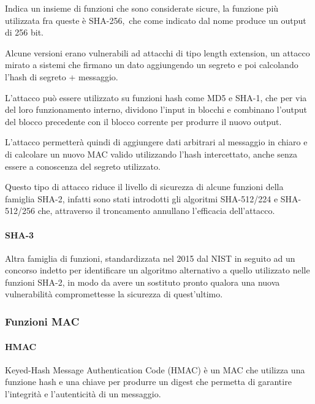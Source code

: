 \documentclass[
]{article}
\begin{document}
{Indica un insieme di funzioni che sono considerate sicure, la funzione
più utilizzata fra queste è }{SHA-256,}{~che come indicato dal nome
produce un output di 256 bit.}

{}

{Alcune versioni erano vulnerabili ad attacchi di tipo }{length
extension}{, un attacco mirato a sistemi che firmano un dato aggiungendo
un segreto e poi calcolando l'hash di segreto + messaggio.}

{L'attacco può essere utilizzato su funzioni hash come MD5 e SHA-1, che
per via del loro funzionamento interno, dividono l'input in blocchi e
combinano l'output del blocco precedente con il blocco corrente per
produrre il nuovo output. }

{L'attacco permetterà quindi di aggiungere dati arbitrari al messaggio
in chiaro e di calcolare un nuovo MAC valido utilizzando l'hash
intercettato, anche senza essere a conoscenza del segreto utilizzato. }

{Questo tipo di attacco riduce il livello di sicurezza di alcune
funzioni della famiglia SHA-2, infatti sono stati introdotti gli
algoritmi SHA-512/224 e SHA-512/256 che, attraverso il troncamento
annullano l'efficacia dell'attacco.}

\paragraph{\texorpdfstring{{SHA-3}}{SHA-3}}\label{h.uzrkvr6fjirg}

{Altra famiglia di funzioni, standardizzata nel 2015 dal NIST in seguito
ad un concorso indetto per identificare un algoritmo alternativo a
quello utilizzato nelle funzioni SHA-2, in modo da avere un sostituto
pronto qualora una nuova vulnerabilità compromettesse la sicurezza di
quest'ultimo.}

\subsubsection{\texorpdfstring{{Funzioni
MAC}}{Funzioni MAC}}\label{h.awuzcdfsa9q3}

\paragraph{\texorpdfstring{{HMAC}}{HMAC}}\label{h.h3bwqcphvckw}

{Keyed-Hash Message Authentication Code (HMAC) è un MAC che utilizza una
funzione hash e una chiave per produrre un digest che permetta di
garantire l'integrità e l'autenticità di un messaggio.}
\end{document}
